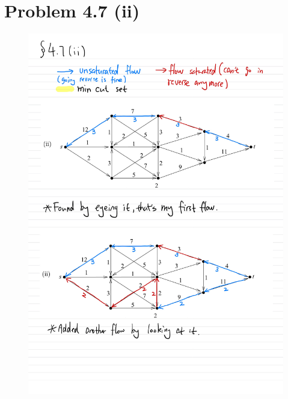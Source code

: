 \documentclass[]{article}
\theoremstyle{definition}
\begin{document}
\section{Problem 4.7 (ii)}
    \begin{figure}
        \centering
        \includegraphics[width=16cm]{HW6-7.jpg}    
    \end{figure}
\end{document}
